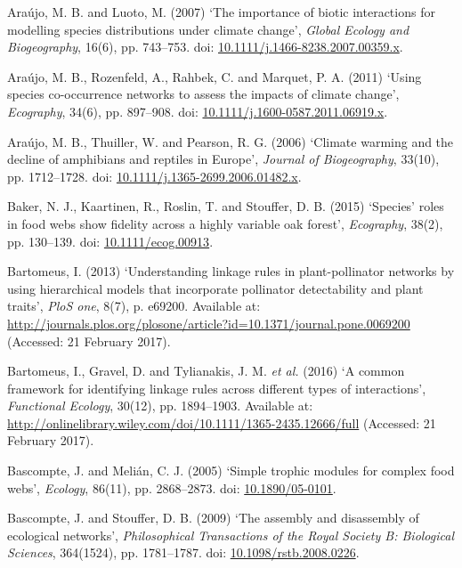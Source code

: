 \documentclass[12pt]{article}
\begin{document}
\hypertarget{ref-arau07ibi}{}
Araújo, M. B. and Luoto, M. (2007) `The importance of biotic
interactions for modelling species distributions under climate change',
\emph{Global Ecology and Biogeography}, 16(6), pp. 743--753. doi:
\href{https://doi.org/10.1111/j.1466-8238.2007.00359.x}{10.1111/j.1466-8238.2007.00359.x}.

\hypertarget{ref-arau11usc}{}
Araújo, M. B., Rozenfeld, A., Rahbek, C. and Marquet, P. A. (2011)
`Using species co-occurrence networks to assess the impacts of climate
change', \emph{Ecography}, 34(6), pp. 897--908. doi:
\href{https://doi.org/10.1111/j.1600-0587.2011.06919.x}{10.1111/j.1600-0587.2011.06919.x}.

\hypertarget{ref-arau06cwd}{}
Araújo, M. B., Thuiller, W. and Pearson, R. G. (2006) `Climate warming
and the decline of amphibians and reptiles in Europe', \emph{Journal of
Biogeography}, 33(10), pp. 1712--1728. doi:
\href{https://doi.org/10.1111/j.1365-2699.2006.01482.x}{10.1111/j.1365-2699.2006.01482.x}.

\hypertarget{ref-bake15srf}{}
Baker, N. J., Kaartinen, R., Roslin, T. and Stouffer, D. B. (2015)
`Species' roles in food webs show fidelity across a highly variable oak
forest', \emph{Ecography}, 38(2), pp. 130--139. doi:
\href{https://doi.org/10.1111/ecog.00913}{10.1111/ecog.00913}.

\hypertarget{ref-bart13ulr}{}
Bartomeus, I. (2013) `Understanding linkage rules in plant-pollinator
networks by using hierarchical models that incorporate pollinator
detectability and plant traits', \emph{PloS one}, 8(7), p. e69200.
Available at:
\url{http://journals.plos.org/plosone/article?id=10.1371/journal.pone.0069200}
(Accessed: 21 February 2017).

\hypertarget{ref-bart16cfi}{}
Bartomeus, I., Gravel, D. and Tylianakis, J. M. \emph{et al.} (2016) `A
common framework for identifying linkage rules across different types of
interactions', \emph{Functional Ecology}, 30(12), pp. 1894--1903.
Available at:
\url{http://onlinelibrary.wiley.com/doi/10.1111/1365-2435.12666/full}
(Accessed: 21 February 2017).

\hypertarget{ref-basc05stm}{}
Bascompte, J. and Melián, C. J. (2005) `Simple trophic modules for
complex food webs', \emph{Ecology}, 86(11), pp. 2868--2873. doi:
\href{https://doi.org/10.1890/05-0101}{10.1890/05-0101}.

\hypertarget{ref-basc09adea}{}
Bascompte, J. and Stouffer, D. B. (2009) `The assembly and disassembly
of ecological networks', \emph{Philosophical Transactions of the Royal
Society B: Biological Sciences}, 364(1524), pp. 1781--1787. doi:
\href{https://doi.org/10.1098/rstb.2008.0226}{10.1098/rstb.2008.0226}.
\end{document}
